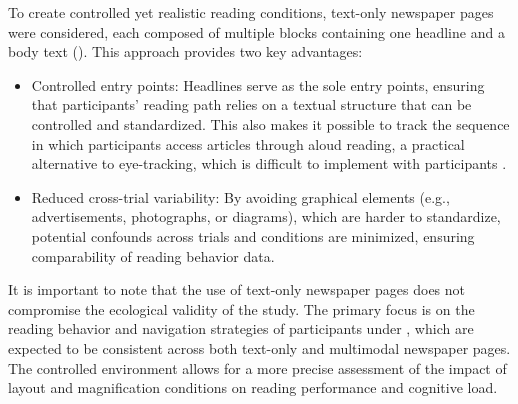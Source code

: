 To create controlled yet realistic reading conditions, text-only newspaper pages were considered, each composed of multiple blocks containing one headline and a body text (). This approach provides two key advantages:
\begin{itemize}
    \item Controlled entry points: Headlines serve as the sole entry points, ensuring that participants' reading path relies on a textual structure that can be controlled and standardized. This also makes it possible to track the sequence in which participants access articles through aloud reading, a practical alternative to eye-tracking, which is difficult to implement with participants \LV.
    \item Reduced cross-trial variability: By avoiding graphical elements (e.g., advertisements, photographs, or diagrams), which are harder to standardize, potential confounds across trials and conditions are minimized, ensuring comparability of reading behavior data.
\end{itemize}

It is important to note that the use of text-only newspaper pages does not compromise the ecological validity of the study. The primary focus is on the reading behavior and navigation strategies of participants under \CVAS, which are expected to be consistent across both text-only and multimodal newspaper pages. The controlled environment allows for a more precise assessment of the impact of layout and magnification conditions on reading performance and cognitive load.


